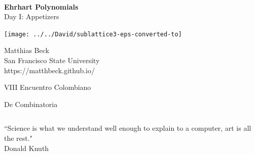 \documentclass[landscape]{foils}
\def\green{\color{green}}
\def\blue{\color{blue}}
\def\black{\color{black}}
\begin{document}
\setlength{\parindent}{0pt}
\setlength{\parskip}{1cm}

\def\Z{\mathbb{Z}}
\def\Q{\mathbb{Q}}
\def\R{\mathbb{R}}
\def\F{\mathcal{F}}
\def\G{\mathcal{G}}
\def\P{\mathcal{P}}
\def\K{\mathcal{K}}
\def\cZ{\mathcal{Z}}
\def\m{\mathbf{m}}
\def\v{\mathbf{v}}
\def\w{\mathbf{w}}
\def\z{\mathbf{z}}
\newcommand\cone{\operatorname{cone}} 
\newcommand\conv{\operatorname{conv}} 
\newcommand\vol{\operatorname{vol}} 
\newcommand\stir{\operatorname{stirl}}
\newcommand\Ehr{\operatorname{Ehr}} 
\newcommand\fl[1]{\left\lfloor {#1} \right\rfloor} 
\newcommand\fr[1]{\left\{ {#1} \right\}} 


\thispagestyle{empty}
\

\begin{center}
  {\green\LARGE \textbf{Ehrhart Polynomials} \\[12pt]
\normalsize
Day I: Appetizers}
\end{center}

\vspace{-.2in}
\texttt{[image: ../../David/sublattice3-eps-converted-to]}

\vspace{-4.5in} 
\blue
\hspace{5in}
Matthias Beck
\\[5pt]
\black
\hspace{5in}
San Francisco State University
\\[5pt]
\blue
\hspace{5in}
https://matthbeck.github.io/
\black

\vspace{1in} 
\hspace{5in}
VIII Encuentro Colombiano 

\vspace{-.4in} 
\hspace{5in}
De Combinatoria

\black

\newpage
\[  \] 

\vspace{1.5cm} 

``Science is what we understand well enough to explain to a computer, art is all the rest." \\ 

\blue       
Donald Knuth 
\black 
\end{document}
